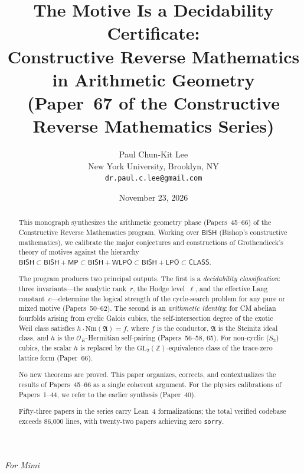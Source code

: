 \documentclass[11pt]{article}
\title{The Motive Is a Decidability Certificate:\\
  Constructive Reverse Mathematics in Arithmetic Geometry\\[6pt]
  \large (Paper~67 of the Constructive Reverse Mathematics Series)}
\author{Paul Chun-Kit Lee \\[2pt]
\normalsize New York University, Brooklyn, NY \\[2pt]
\normalsize \texttt{dr.paul.c.lee@gmail.com}}
\date{November 23, 2026}
\theoremstyle{plain}
\theoremstyle{definition}
\theoremstyle{remark}
\newcommand{\Z}{\mathbb{Z}}
\newcommand{\calO}{\mathcal{O}}
\newcommand{\fA}{\mathfrak{A}}
\newcommand{\Nm}{\mathrm{Nm}}
\newcommand{\GL}{\mathrm{GL}}
\newcommand{\BISH}{\mathsf{BISH}}
\newcommand{\LPO}{\mathsf{LPO}}
\newcommand{\WLPO}{\mathsf{WLPO}}
\newcommand{\MP}{\mathsf{MP}}
\newcommand{\CLASS}{\mathsf{CLASS}}
\begin{document}
\maketitle

\vspace{-12pt}
\begin{center}
\textit{For Mimi}
\end{center}
\vspace{6pt}


\begin{abstract}
This monograph synthesizes the arithmetic geometry phase
(Papers~45--66) of the Constructive Reverse Mathematics program.
Working over $\BISH$ (Bishop's constructive mathematics), we
calibrate the major conjectures and constructions of Grothendieck's
theory of motives against the hierarchy
$\BISH \subset \BISH + \MP \subset \BISH + \WLPO \subset
\BISH + \LPO \subset \CLASS$.

The program produces two principal outputs.  The first is a
\emph{decidability classification}: three invariants---the analytic
rank~$r$, the Hodge level~$\ell$, and the effective Lang
constant~$c$---determine the logical strength of the cycle-search
problem for any pure or mixed motive (Papers~50--62).  The second
is an \emph{arithmetic identity}: for CM abelian fourfolds arising
from cyclic Galois cubics, the self-intersection degree of the
exotic Weil class satisfies $h \cdot \Nm(\fA) = f$, where $f$ is
the conductor, $\fA$ is the Steinitz ideal class, and $h$ is the
$\calO_K$-Hermitian self-pairing (Papers~56--58, 65).  For
non-cyclic ($S_3$) cubics, the scalar $h$ is replaced by the
$\GL_2(\Z)$-equivalence class of the trace-zero lattice form
(Paper~66).

No new theorems are proved.  This paper organizes, corrects, and
contextualizes the results of Papers~45--66 as a single coherent
argument.  For the physics calibrations of Papers~1--44, we refer
to the earlier synthesis (Paper~40).

Fifty-three papers in the series carry Lean~4 formalizations;
the total verified codebase exceeds 86{,}000 lines, with
twenty-two papers achieving zero \texttt{sorry}.
\end{abstract}

\tableofcontents

\end{document}

